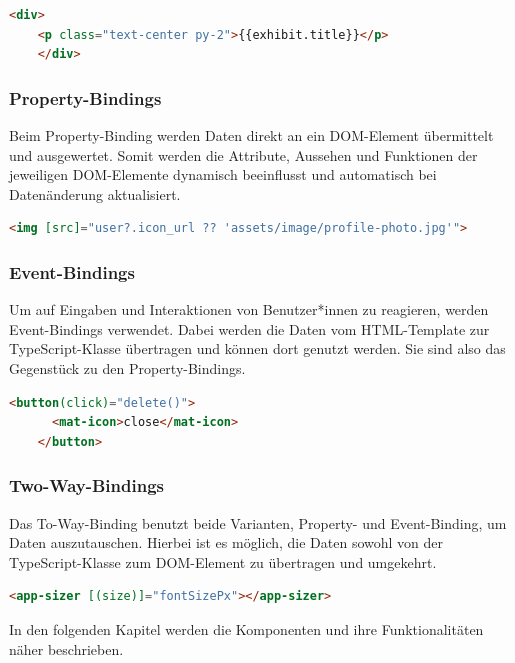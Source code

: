 \begin{lstlisting}[caption={{Beispiel für Interpolation in der 3D-Gallery}},language=HTML,label=lst:impl:interpolation]
    <div>
    <p class="text-center py-2">{{exhibit.title}}</p>
    </div>
\end{lstlisting}

\subsubsection{Property-Bindings}
Beim Property-Binding werden Daten direkt an ein DOM-Element übermittelt und ausgewertet. Somit werden die Attribute, Aussehen und Funktionen der jeweiligen DOM-Elemente dynamisch beeinflusst und automatisch bei Datenänderung aktualisiert. \cite{AngularPropertyBinding}
\begin{lstlisting}[caption={{Beispiel für Property-Bindings in der 3D-Gallery}},language=HTML,label=lst:impl:property-binding]
    <img [src]="user?.icon_url ?? 'assets/image/profile-photo.jpg'">
\end{lstlisting}

\subsubsection{Event-Bindings}
Um auf Eingaben und Interaktionen von Benutzer*innen zu reagieren, werden Event-Bindings verwendet. Dabei werden die Daten vom HTML-Template zur TypeScript-Klasse übertragen und können dort genutzt werden. Sie sind also das Gegenstück zu den Property-Bindings. \cite{AngularEventBinding}
\begin{lstlisting}[caption={{Beispiel für Event-Bindings in der 3D-Gallery}},language=HTML,label=lst:impl:event-binding]
    <button(click)="delete()">
      <mat-icon>close</mat-icon>
    </button>
\end{lstlisting}

\subsubsection{Two-Way-Bindings}
Das To-Way-Binding benutzt beide Varianten, Property- und Event-Binding, um Daten auszutauschen. Hierbei ist es möglich, die Daten sowohl von der TypeScript-Klasse zum DOM-Element zu übertragen und umgekehrt. \cite{AngularTwoWayBinding}
\begin{lstlisting}[caption={{Beispiel für Two-Way-Bindings \cite{AngularTwoWayBinding}}},language=HTML,label=lst:impl:two-way-bindings]
    <app-sizer [(size)]="fontSizePx"></app-sizer>
\end{lstlisting}
In den folgenden Kapitel werden die Komponenten und ihre Funktionalitäten näher beschrieben. 

